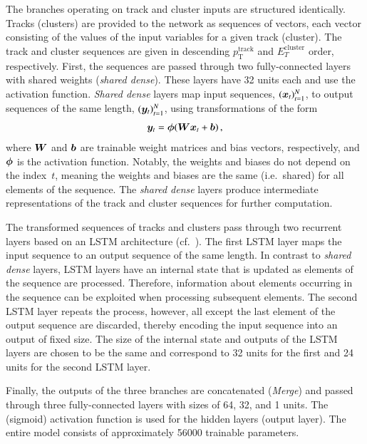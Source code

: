 The branches operating on track and cluster inputs are structured
identically. Tracks (clusters) are provided to the network as sequences of
vectors, each vector consisting of the values of the input variables for a given
track (cluster). The track and cluster sequences are given in descending
$p_{\text{T}}^{\text{track}}$ and $E_{T}^{\text{cluster}}$ order,
respectively. First, the sequences are passed through two fully-connected layers
with shared weights (\emph{shared dense}).  These layers have 32 units each and
use the \ReLU activation function. \emph{Shared dense} layers map input
sequences, $(\bm{x}_t)_{t=1}^{N}$, to output sequences of the same length,
$(\bm{y}_t)_{t=1}^{N}$, using transformations of the form
\begin{align*}
  \bm{y}_t = \bm{\phi}(\bm{W} \bm{x}_t + \bm{b}) \,\text{,}
\end{align*}
where $\bm{W}$ and $\bm{b}$ are trainable weight matrices and bias
vectors, respectively, and $\bm{\phi}$ is the activation function.  Notably,
the weights and biases do not depend on the index~$t$, meaning the weights and
biases are the same (i.e.\ shared) for all elements of the sequence. The
\emph{shared dense} layers produce intermediate representations of the track and
cluster sequences for further computation.

The transformed sequences of tracks and clusters pass through two recurrent
layers based on an LSTM architecture (cf.\ ). The first LSTM layer
maps the input sequence to an output sequence of the same length. In contrast to
\emph{shared dense} layers, LSTM layers have an internal state that is updated
as elements of the sequence are processed. Therefore, information about elements
occurring in the sequence can be exploited when processing subsequent
elements. The second LSTM layer repeats the process, however, all except the
last element of the output sequence are discarded, thereby encoding the input
sequence into an output of fixed size. The size of the internal state and
outputs of the LSTM layers are chosen to be the same and correspond to 32 units
for the first and 24 units for the second LSTM layer.

Finally, the outputs of the three branches are concatenated
(\emph{Merge}) and passed through three fully-connected layers with
sizes of 64, 32, and 1 units. The \ReLU (sigmoid) activation function
is used for the hidden layers (output layer). The entire model
consists of approximately \num{56000} trainable parameters.


